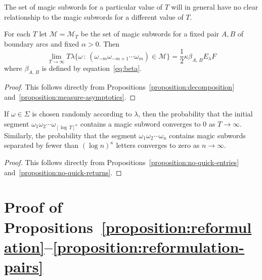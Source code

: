 \documentclass[AHL, Unicode, longabstracts, published]{cedram}
\begin{document}
\begin{rema}\label{remark:magicSubwords}
The set of magic subwords for a particular value of $T$ will in general have no clear relationship to the magic subwords for a different value of $T$.
\end{rema}

\begin{prop}\label{proposition:magicWordMeasure}
For each $T$ let $\mathcal{M}=\mathcal{M}_{T}$ be the set of magic subwords for a fixed pair $A,B$ of boundary arcs and fixed $\alpha >0$. Then
\begin{equation}\label{eq:magicWordMeasure}
\lim_{T \rightarrow \infty }T\lambda \{\omega \,:\,(\omega_{-m}\omega_{-m+1}\dotsb \omega_{m})\in \mathcal{M}\}= \frac{1}{2}\kappa \beta_{A,\,B}E_{\lambda}F
\end{equation}
where $\beta_{A,\,B}$ is defined by equation~\eqref{eq:beta}.
\end{prop}

\begin{proof}
This follows directly from Propositions~\ref{proposition:decomposition} and~\ref{proposition:measure-asymptotics}.
\end{proof}



\begin{coro}\label{corollary:quickReturns}
If $\omega \in \Sigma$ is chosen randomly according to $\lambda$, then the probability that the initial segment $\omega_{1}\omega_{2}\dotsb\omega_{[\log\,T]^{\kappa}}$ contains a magic subword converges to $0$ as $T \rightarrow \infty$. Similarly, the probability that the segment $\omega_{1}\omega_{2}\dotsb \omega_{n}$ contains magic subwords separated by fewer than $(\log n)^{\kappa }$ letters converges to zero as $n \rightarrow \infty$.
\end{coro}

\begin{proof}
This follows directly from Propositions~\ref{proposition:no-quick-entries} and~\ref{proposition:no-quick-returns}.
\end{proof}



\section{Proof of Propositions~\ref{proposition:reformulation}--\ref{proposition:reformulation-pairs}}\label{sec:final-step}
\end{document}
